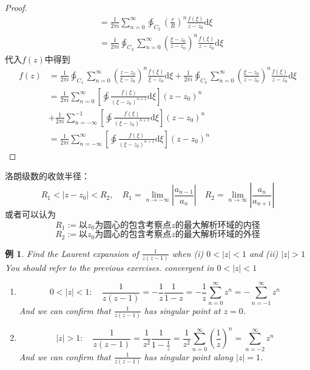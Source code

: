 \documentclass[10pt, a4paper, oneside]{ctexbook}
\newtheorem{example}[theorem]{例}
\def\D{\mathrm{d}}
\newcommand{\F}[1][z]
{\ensuremath{f(#1)}}
\begin{document}
\begin{proof}
\begin{align*}
         & =\frac{1}{2\pi i} \sum_{n=0}^\infty \ointctrclockwise_{C_2} \left(\frac{r}{R}\right)^n  \frac{\F[\xi]}{z-z_0} \D \xi            \\
         & = \frac{1}{2\pi i} \ointctrclockwise_{C_2} \sum_{n=0}^\infty \left(\frac{\xi-z_0}{z-z_0}\right)^n  \frac{\F[\xi]}{z-z_0} \D \xi
    \end{align*}
    代入$\F$中得到
    \begin{align*}
        \F & =\frac{1}{2\pi i} \ointctrclockwise_{C_1} \sum_{n=0}^\infty  \left(\frac{z-z_0}{\xi-z_0}\right)^n  \frac{\F[\xi]}{\xi-z_0} \D \xi
        + \frac{1}{2\pi i} \ointctrclockwise_{C_2} \sum_{n=0}^\infty \left(\frac{\xi-z_0}{z-z_0}\right)^n  \frac{\F[\xi]}{z-z_0} \D \xi        \\
           & = \frac{1}{2\pi i}  \sum_{n=0}^\infty \left[\ointctrclockwise \frac{\F[\xi]}{(\xi-z_0)^{n+1}}\D \xi \right](z-z_0)^n              \\
           & +\frac{1}{2\pi i}  \sum_{n=-\infty}^{-1} \left[\ointctrclockwise \frac{\F[\xi]}{(\xi-z_0)^{n+1}}\D \xi\right](z-z_0)^n            \\
           & = \frac{1}{2\pi i}  \sum_{n=-\infty}^\infty \left[\ointctrclockwise \frac{\F[\xi]}{(\xi-z_0)^{n+1}}\D \xi \right](z-z_0)^n
    \end{align*}
\end{proof}
洛朗级数的收敛半径：
$$
    R_1<|z-z_0|<R_2,\quad R_1=\lim_{n\to -\infty} \left| \frac{a_{n-1}}{a_n} \right|\quad R_2=\lim_{n \to \infty} \left| \frac{a_n}{a_{n+1}} \right|
$$
或者可以认为
$$R_1 := \text{以$z_0$为圆心的包含考察点$z$的最大解析环域的内径}$$
$$R_2 := \text{以$z_0$为圆心的包含考察点$z$的最大解析环域的外径}$$
\begin{example}
    Find the Laurent expansion of $\frac{1}{z(z-1)}$ when (i) $0<|z|<1$ and (ii) $|z|>1$ You should refer to the previous exercises. convergent in $0<|z|<1$
    \begin{enumerate}
        \item $$0<|z|<1: \quad \frac{1}{z(z-1)}=-\frac{1}{z} \frac{1}{1-z}=-\frac{1}{z} \sum_{n=0}^{\infty} z^{n}=-\sum_{n=-1}^{\infty} z^{n}$$ And we can confirm that $\frac{1}{z(z-1)}$ has singular point at $z=0$.
        \item $$|z|>1:\quad \frac{1}{z(z-1)}=\frac{1}{z^{2}} \frac{1}{1-\frac{1}{z}}=\frac{1}{z^{2}} \sum_{n=0}^{\infty}\left(\frac{1}{z}\right)^{n}=\sum_{n=-2}^{\infty} z^{n}$$ And we can confirm that $\frac{1}{z(z-1)}$ has singular point along $|z|=1$.
    \end{enumerate}
\end{example}
\end{document}
